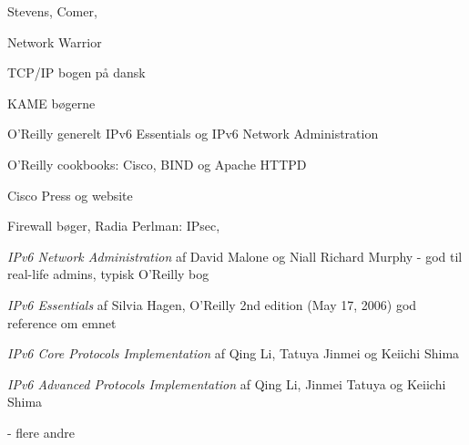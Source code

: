\documentclass[20pt,landscape,a4paper,footrule]{foils}
\begin{document}

\begin{list2}
\item Stevens, Comer,
\item Network Warrior
\item TCP/IP bogen på dansk
\item KAME bøgerne
\item O'Reilly generelt IPv6 Essentials og IPv6 Network Administration
\item O'Reilly cookbooks: Cisco, BIND og Apache HTTPD
\item Cisco Press og website
\item Firewall bøger, Radia Perlman: IPsec,
\end{list2}


\begin{list1}
\item \emph{IPv6 Network Administration}
af David Malone og Niall Richard Murphy
 - god til real-life admins, typisk
O'Reilly bog
\item \emph{IPv6 Essentials} af Silvia Hagen, O'Reilly 2nd edition (May 17, 2006)
	god reference om emnet
\item \emph{IPv6 Core Protocols Implementation}
af Qing Li, Tatuya Jinmei og Keiichi Shima
\item \emph{IPv6 Advanced Protocols Implementation}
af Qing Li, Jinmei Tatuya og Keiichi Shima
\item - flere andre
\end{list1}


%
\end{document}
